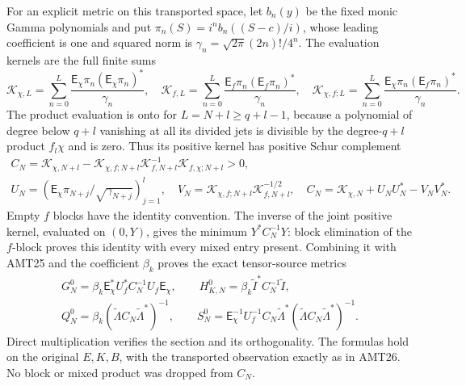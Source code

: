 \documentclass[11pt,a4paper]{article}
\begin{document}
For an explicit metric on this transported space, let $b_n(y)$ be
the fixed monic Gamma polynomials and put
$\pi_n(S)=i^n b_n((S-c)/i)$, whose leading coefficient is one
and squared norm is $\gamma_n=\sqrt{2\pi}(2n)!/4^n$.
The evaluation kernels are the full finite sums
\[
 \mathscr K_{\chi,L}=\sum_{n=0}^L
   \frac{\mathsf E_\chi\pi_n(\mathsf E_\chi\pi_n)^*}{\gamma_n},\quad
 \mathscr K_{f,L}=\sum_{n=0}^L
   \frac{\mathsf E_f\pi_n(\mathsf E_f\pi_n)^*}{\gamma_n},\quad
 \mathscr K_{\chi,f;L}=\sum_{n=0}^L
   \frac{\mathsf E_\chi\pi_n(\mathsf E_f\pi_n)^*}{\gamma_n}.
\]
The product evaluation is onto for $L=N+l\ge q+l-1$, because
a polynomial of degree below $q+l$ vanishing at all its divided
jets is divisible by the degree-$q+l$ product $f_l\chi$ and is
zero. Thus its positive kernel has positive Schur complement
\[
\begin{gathered}
 C_N=\mathscr K_{\chi,N+l}-\mathscr K_{\chi,f;N+l}
            \mathscr K_{f,N+l}^{-1}\mathscr K_{f,\chi;N+l}>0,\\
 U_N=(\mathsf E_\chi\pi_{N+j}/\sqrt{\gamma_{N+j}})_{j=1}^l,
 \quad V_N=\mathscr K_{\chi,f;N+l}\mathscr K_{f,N+l}^{-1/2},\quad
 C_N=\mathscr K_{\chi,N}+U_NU_N^*-V_NV_N^*.
\end{gathered}\tag{AMT27}
\]
Empty $f$ blocks have the identity convention. The inverse of the
joint positive kernel, evaluated on $(0,Y)$, gives the minimum
$Y^*C_N^{-1}Y$: block elimination of the $f$-block proves this
identity with every mixed entry present. Combining it with AMT25
and the coefficient $\beta_k$ proves the exact tensor-source metrics
\[
\boxed{\begin{gathered}
 G_N^0=\beta_k\mathsf E_\chi^*U_f^*C_N^{-1}U_f\mathsf E_\chi,\qquad
 H_{K,N}^0=\beta_k\widetilde I^*C_N^{-1}\widetilde I,\\
 Q_N^0=\beta_k(\widetilde\Lambda C_N\widetilde\Lambda^*)^{-1},\qquad
 S_N^0=\mathsf E_\chi^{-1}U_f^{-1}C_N\widetilde\Lambda^*
                   (\widetilde\Lambda C_N\widetilde\Lambda^*)^{-1}.
\end{gathered}}\tag{AMT28}
\]
Direct multiplication verifies the section and its orthogonality.
The formulas hold on the original $E,K,B$, with the transported
observation exactly as in AMT26. No block or mixed product was
dropped from $C_N$.
\end{document}
